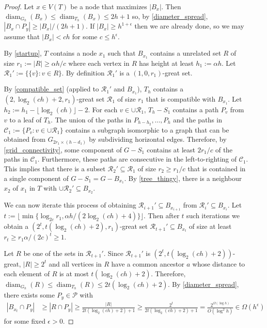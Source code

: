 \documentclass{patmorin}
\DeclareMathOperator{\diam}{diam}
\renewcommand{\le}{\leqslant}
\renewcommand{\ge}{\geqslant}
\begin{document}
\begin{proof}
  Let $x\in V(T)$ be a node that maximizes $|B_x|$.  Then $\diam_{G_h}(B_x)\le\diam_{T_h}(B_x) \le 2h+1$ so, by \cref{diameter_spread}, $|B_x\cap P_y|\ge |B_x|/(2h+1)$.  If $|B_x|\ge h^{1+\epsilon}$ then we are already done, so we may assume that $|B_x| < ch$ for some $c \le h^{\epsilon}$.

  By \cref{startup}, $T$ contains a node $x_1$ such that $B_{x_1}$ contains a unrelated set $R$ of size $r_1:=|R|\ge \alpha h/c$ where each vertex in $R$ has height at least $h_1:=\alpha h$.  Let  $\mathcal{R}_1':=\{\{v\}:v\in R\}$.  By definition $\mathcal{R}_1'$ is a $(1,0,r_1)$-great set.

  By \cref{compatible_set} (applied to $\mathcal{R}_1'$ and $B_{x_1}$), $T_h$ contains a $(2,\log_2(ch)+2,r_1)$-great set $\mathcal{R}_1$ of size $r_1$ that is compatible with $B_{x_1}$.  Let $h_2:=h_1-\lfloor\log_2(ch)\rfloor -2$.  For each $v\in\cup\mathcal{R}_1$, $T_h-S_1$ contains a path $P_v$ from $v$ to a leaf of $T_h$.  The union of the paths in $P_{h-h_2},\ldots,P_{h}$ and the paths in $\mathcal{C}_1:=\{P_v:v\in\cup\mathcal{R}_1\}$ contains a subgraph isomorphic to a graph that can be obtained from $G_{2r_1\times (h-d_1)}$ by subdividing horizontal edges.  Therefore, by \cref{grid_connectivity}, some component of $G-S_1$ contains at least $2r_1/c$ of the paths in $\mathcal{C}_1$.  Furthermore, these paths are consecutive in the left-to-righting of $\mathcal{C}_1$.  This implies that there is a subset $\mathcal{R}_2'\subseteq \mathcal{R}_1$ of size $r_2\ge r_1/c$ that is contained in a single component of $G-S_1=G-B_{x_1}$. By \cref{tree_thingy}, there is a neighbour $x_2$ of $x_1$ in $T$ with $\cup\mathcal{R}_2'\subseteq B_{x_2}$.

  We can now iterate this process of obtaining $\mathcal{R}_{i+1}'\subseteq B_{x_{i+1}}$ from $\mathcal{R}_i'\subseteq B_{x_i}$. Let $t:= \lfloor \min\{\log_{2c} r_1,\alpha h/(2\log_2(ch)+4)\}\rfloor$. Then after $t$ such iterations we obtain a $(2^t,t(\log_2(ch)+2),r_1)$-great set $\mathcal{R}_{t+1}'\subseteq B_{x_t}$ of size at least $r_t \ge r_1\alpha/(2c)^t \ge 1$.

  Let $R$ be one of the sets in $\mathcal{R}_{t+1}'$.  Since $\mathcal{R}_{t+1}'$ is $(2^t,t(\log_2(ch)+2))$-great, $|R|\ge 2^t$ and all vertices in $R$ have a common ancestor $a$ whose distance to each element of $R$ is at most $t(\log_2(ch)+2)$.  Therefore, $\diam_{G_h}(R)\le\diam_{T_h}(R)\le 2t(\log_2(ch)+2)$. By \cref{diameter_spread}, there exists some $P_y\in\mathcal{P}$ with
  \begin{align*}
    |B_{x_t}\cap P_y|
    & \ge |R\cap P_y|
    \ge \frac{|R|}{2t(\log_2(ch)+2)+1}
    \ge \frac{2^t}{2t(\log_2(ch)+2)+1}
    = \frac{2^{\Omega(\log h)}}{O(\log^2 h)}
    \in \Omega(h^\epsilon)
  \end{align*}
  for some fixed $\epsilon >0$.
\end{proof}
\end{document}
